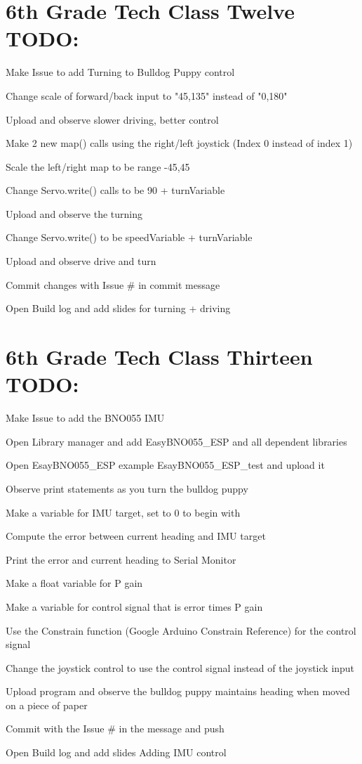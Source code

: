 \documentclass{article}
\begin{document}
\section{6th Grade Tech Class Twelve TODO:}
\begin{todolist}
	\item Make Issue to add Turning to Bulldog Puppy control
	\item Change scale of forward/back input to "45,135" instead of "0,180"
	\item Upload and observe slower driving, better control
	\item Make 2 new map() calls using the right/left joystick (Index 0 instead of index 1)
	\item Scale the left/right map to be range -45,45
	\item Change Servo.write() calls to be 90 + turnVariable
	\item Upload and observe the turning
	\item Change Servo.write() to be speedVariable + turnVariable
	\item Upload and observe drive and turn
	\item Commit changes with Issue \# in commit message
	\item Open Build log and add slides for turning + driving
\end{todolist}
\newpage
\section{6th Grade Tech Class Thirteen TODO:}
\begin{todolist}
	\item Make Issue to add the BNO055 IMU
	\item Open Library manager and add EasyBNO055\_ESP and all dependent libraries  
	\item Open EsayBNO055\_ESP example EsayBNO055\_ESP\_test and upload it
	\item Observe print statements as you turn the bulldog puppy
	\item Make a variable for IMU target, set to 0 to begin with
	\item Compute the error between current heading and IMU target
	\item Print the error and current heading to Serial Monitor
	\item Make a float variable for P gain
	\item Make a variable for control signal that is error times P gain
	\item Use the Constrain function (Google Arduino Constrain Reference) for the control signal
	\item Change the joystick control to use the control signal instead of the joystick input
	\item Upload program and observe the bulldog puppy maintains heading when moved on a piece of paper
	\item Commit with the Issue \# in the message and push
	\item Open Build log and add slides Adding IMU control
\end{todolist}
\end{document}
